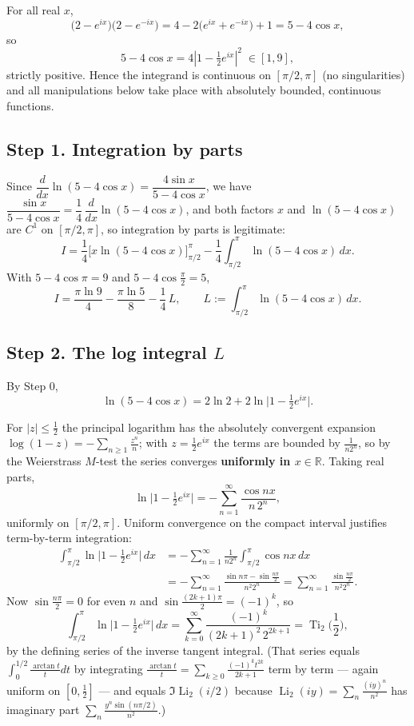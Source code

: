 \documentclass[11pt]{article}
\theoremstyle{remark}
\begin{document}
For all real $x$,
\[\big(2-e^{ix}\big)\big(2-e^{-ix}\big)=4-2\big(e^{ix}+e^{-ix}\big)+1=5-4\cos x,\]
so
\[5-4\cos x=4\left|1-\tfrac12 e^{ix}\right|^{2}\;\in[1,9],\]
strictly positive. Hence the integrand is continuous on $[\pi/2,\pi]$ (no singularities) and all manipulations below take place with absolutely bounded, continuous functions.

\subsection*{Step 1. Integration by parts}

Since $\dfrac{d}{dx}\ln(5-4\cos x)=\dfrac{4\sin x}{5-4\cos x}$, we have
$\dfrac{\sin x}{5-4\cos x}=\dfrac14\,\dfrac{d}{dx}\ln(5-4\cos x)$, and both factors $x$ and $\ln(5-4\cos x)$ are $C^1$ on $[\pi/2,\pi]$, so integration by parts is legitimate:
\[I=\frac14\Big[x\ln(5-4\cos x)\Big]_{\pi/2}^{\pi}-\frac14\int_{\pi/2}^{\pi}\ln(5-4\cos x)\,dx .\]
With $5-4\cos\pi=9$ and $5-4\cos\frac\pi2=5$,
\[I=\frac{\pi\ln 9}{4}-\frac{\pi\ln 5}{8}-\frac14\,L,
\qquad L:=\int_{\pi/2}^{\pi}\ln(5-4\cos x)\,dx. \tag{1}\]

\subsection*{Step 2. The log integral $L$}

By Step 0,
\[\ln(5-4\cos x)=2\ln 2+2\ln\Big|1-\tfrac12 e^{ix}\Big|. \tag{2}\]

For $|z|\le\frac12$ the principal logarithm has the absolutely convergent expansion $\log(1-z)=-\sum_{n\ge1}\frac{z^n}{n}$; with $z=\frac12e^{ix}$ the terms are bounded by $\frac1{n2^n}$, so by the Weierstrass $M$-test the series converges \textbf{uniformly in $x\in\mathbb R$}. Taking real parts,
\[\ln\Big|1-\tfrac12 e^{ix}\Big|=-\sum_{n=1}^{\infty}\frac{\cos nx}{n\,2^{n}},\]
uniformly on $[\pi/2,\pi]$. Uniform convergence on the compact interval justifies term-by-term integration:
\[\begin{aligned}
\int_{\pi/2}^{\pi}\ln\Big|1-\tfrac12 e^{ix}\Big|\,dx
&=-\sum_{n=1}^{\infty}\frac1{n2^n}\int_{\pi/2}^{\pi}\cos nx\,dx\\
&=-\sum_{n=1}^{\infty}\frac{\sin n\pi-\sin\frac{n\pi}{2}}{n^{2}2^{n}}
=\sum_{n=1}^{\infty}\frac{\sin\frac{n\pi}{2}}{n^{2}2^{n}} .
\end{aligned}\]
Now $\sin\frac{n\pi}{2}=0$ for even $n$ and $\sin\frac{(2k+1)\pi}{2}=(-1)^k$, so
\[\int_{\pi/2}^{\pi}\ln\Big|1-\tfrac12 e^{ix}\Big|\,dx
=\sum_{k=0}^{\infty}\frac{(-1)^{k}}{(2k+1)^{2}\,2^{2k+1}}
=\operatorname{Ti}_2\Big(\frac12\Big), \tag{3}\]
by the defining series of the inverse tangent integral. (That series equals $\int_0^{1/2}\frac{\arctan t}{t}dt$ by integrating $\frac{\arctan t}{t}=\sum_{k\ge0}\frac{(-1)^k t^{2k}}{2k+1}$ term by term --- again uniform on $[0,\frac12]$ --- and equals $\Im\operatorname{Li}_2(i/2)$ because $\operatorname{Li}_2(iy)=\sum_n \frac{(iy)^n}{n^2}$ has imaginary part $\sum_n\frac{y^n\sin(n\pi/2)}{n^2}$.)
\end{document}
